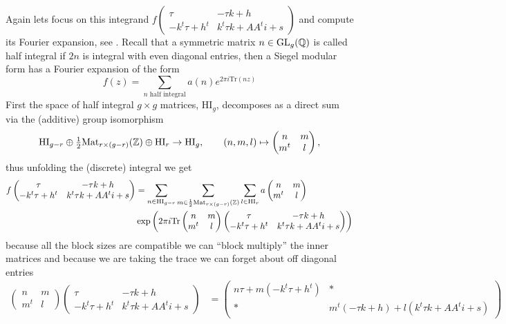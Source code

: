 Again lets focus on this integrand \(f\begin{pmatrix} \tau & -\tau k + h\\ -k^t \tau + h^t & k^t \tau k + A A^t i + s \end{pmatrix}\) and compute its Fourier expansion, see \cite[3.4]{bruinier123ModularForms2008}. Recall that a symmetric matrix \(n\in \GL_g(\Q)\) is called half integral if \(2n\) is integral with even diagonal entries, then a Siegel modular form has a Fourier expansion of the form
\[f(z) = \sum_{n \text{ half integral}}a(n) e^{2\pi i \mathrm{Tr}(nz)} \]
First the space of half integral \(g\times g\) matrices, \(\mathrm{HI}_g\), decomposes as a direct sum via the (additive) group isomorphism 
\[ \mathrm{HI}_{g-r} \oplus \tfrac{ 1}{ 2} \mathrm{Mat}_{ r\times (g-r)}(\Z) \oplus \mathrm{HI}_{r}\to\mathrm{HI}_g, \qquad (n, m, l)\mapsto \begin{pmatrix} n & m\\ m^t & l \end{pmatrix}, \]
thus unfolding the (discrete) integral we get 
\begin{align*}
    f\begin{pmatrix} \tau & -\tau k + h\\ -k^t \tau + h^t & k^t \tau k + A A^t i + s \end{pmatrix} &=   \sum_{n\in\mathrm{HI}_{g-r}} \sum_{m\in\frac{1}{2} \mathrm{Mat}_{ r\times (g-r)}(\Z)} \sum_{l\in\mathrm{HI}_{r}} a\begin{pmatrix} n & m\\ m^t & l \end{pmatrix} \\
    &\exp \left(2\pi i \mathrm{Tr} \begin{pmatrix} n & m\\ m^t & l \end{pmatrix}\begin{pmatrix} \tau & -\tau k + h\\ -k^t \tau + h^t & k^t \tau k + A A^t i + s \end{pmatrix} \right)  \\
\end{align*}
because all the block sizes are compatible we can ``block multiply'' the inner matrices and because we are taking the trace we can forget about off diagonal entries
\begin{align*}
    \begin{pmatrix} n & m\\ m^t & l \end{pmatrix}\begin{pmatrix} \tau & -\tau k + h\\ -k^t \tau + h^t & k^t \tau k + A A^t i + s \end{pmatrix} &= 
    \begin{pmatrix} n\tau + m(-k^t \tau + h^t ) & \ast\\ \ast & m^t(-\tau k + h) + l( k^t \tau k + A A^t i + s) \end{pmatrix}
\end{align*}

